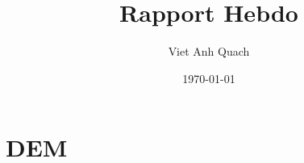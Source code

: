 \documentclass[10pt]{beamer}
\title{Rapport Hebdo}
\author{Viet Anh Quach}
\institute{3SR}
\date{\today}
\begin{document}
\begin{frame}
    \titlepage
\end{frame}


\section{DEM}


\end{document}

